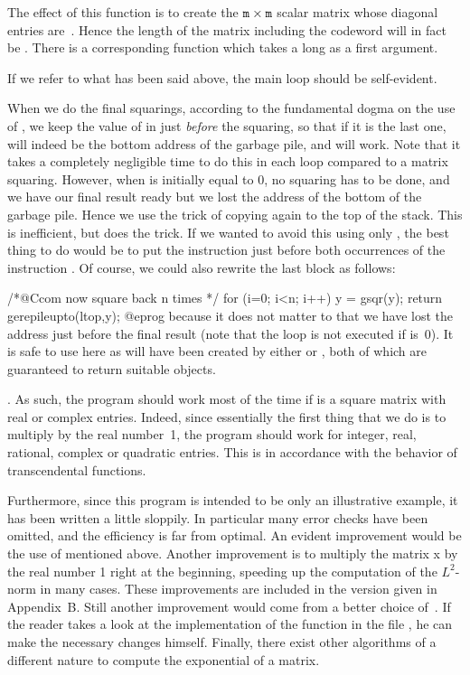 
\noindent
The effect of this function is to create the ${\tt m}\times{\tt m}$ scalar
matrix whose diagonal entries are~. Hence the length of the matrix
including the codeword will in fact be .  There is a corresponding
function  which takes a long as a first argument.

If we refer to what has been said above, the main loop should be self-evident.

When we do the final squarings, according to the fundamental dogma on the
use of , we keep the value of  in  just {\it
before\/} the squaring, so that if it is the last one,  will indeed
be the bottom address of the garbage pile, and  will work. Note
that it takes a completely negligible time to do this in each loop compared
to a matrix squaring.  However, when  is initially equal to 0, no
squaring has to be done, and we have our final result ready but we lost the
address of the bottom of the garbage pile. Hence we use the trick of copying
 again to the top of the stack. This is inefficient, but does the trick.
If we wanted to avoid this using only , the best thing to do
would be to put the instruction  just before both occurrences
of the instruction . Of course, we could also rewrite the
last block as follows:

\bprog
  /*@Ccom now square back n times */
  for (i=0; i<n; i++) y = gsqr(y);
  return gerepileupto(ltop,y);
@eprog
\noindent
because it does not matter to  that we have lost the address
just before the final result (note that the loop is not executed if 
is~0). It is safe to use  here as  will have been
created by either  or , both of which are guaranteed to
return suitable objects.

. As such, the program should work most of the time if
 is a square matrix with real or complex entries. Indeed, since
essentially the first thing that we do is to multiply by the real number~1,
the program should work for integer, real, rational, complex or quadratic
entries. This is in accordance with the behavior of transcendental functions.

Furthermore, since this program is intended to be only an illustrative
example, it has been written a little sloppily. In particular many error
checks have been omitted, and the efficiency is far from optimal. An evident
improvement would be the use of  mentioned above. Another
improvement is to multiply the matrix x by the real number 1 right at the
beginning, speeding up the computation of the $L^2$-norm in many cases. These
improvements are included in the version given in Appendix~B. Still another
improvement would come from a better choice of~. If the reader takes a
look at the implementation of the function  in the file
, he can make the necessary changes himself. Finally,
there exist other algorithms of a different nature to compute the exponential
of a matrix.

